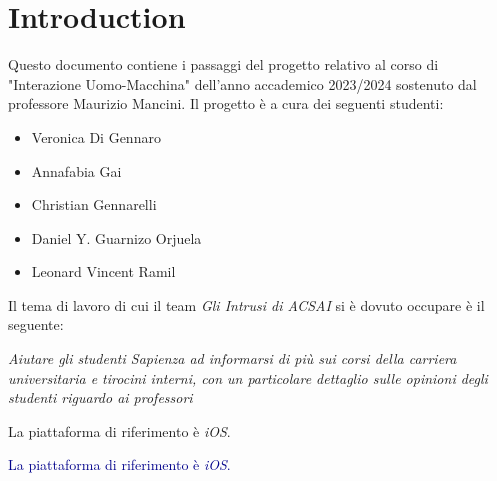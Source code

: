 \chapter*{Introduction}
  

Questo documento contiene i passaggi del progetto relativo
al corso di "Interazione Uomo-Macchina" dell'anno accademico 
2023/2024 sostenuto dal professore Maurizio Mancini.
Il progetto è a cura dei seguenti studenti:
\begin{itemize}
    \item Veronica Di Gennaro
    \item Annafabia Gai
    \item Christian Gennarelli
    \item Daniel Y. Guarnizo Orjuela
    \item Leonard Vincent Ramil
\end{itemize}

Il tema di lavoro di cui il team \textit{Gli Intrusi di ACSAI} 
si è dovuto occupare è il seguente:
\begin{center}
    \textit{Aiutare gli studenti Sapienza ad informarsi di più sui corsi della carriera universitaria e tirocini interni, con un particolare dettaglio sulle opinioni degli studenti riguardo ai professori}
\end{center}
La piattaforma di riferimento è \textit{iOS}.

\textcolor{darkblue}{La piattaforma di riferimento è \textit{iOS}.}